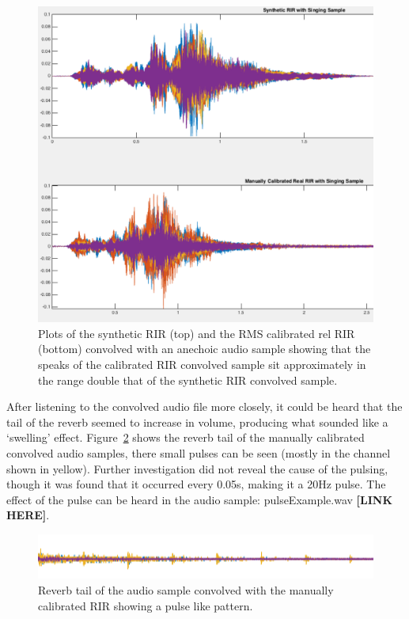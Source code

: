 \documentclass[../../main.tex]{subfiles}
\begin{document}
	\begin{figure}[H]
		\begin{center}
			\includegraphics[scale = 0.3]{Sections/Implementation/RealRIRs/images/calibration/CalMan_Sing_edit.png} 
			\caption{Plots of the synthetic \ac{RIR} (top) and the RMS calibrated rel \ac{RIR} (bottom) convolved with an anechoic audio sample showing that the speaks of the calibrated \ac{RIR} convolved sample sit approximately in the range double that of the synthetic \ac{RIR} convolved sample.}
			\label{calMansing}
		\end{center}
	\end{figure}

	After listening to the convolved audio file more closely, it could be heard that the tail of the reverb seemed to increase in volume, producing what sounded like a `swelling' effect. Figure~\ref{pulse} shows the reverb tail of the manually calibrated convolved audio samples, there small pulses can be seen (mostly in the channel shown in yellow). Further investigation did not reveal the cause of the pulsing, though it was found that it occurred every 0.05s, making it a 20Hz pulse. The effect of the pulse can be heard in the audio sample: pulseExample.wav \textbf{[LINK HERE]}.

	\begin{figure}[H]
		\begin{center}
			\includegraphics[scale = 1]{Sections/Implementation/RealRIRs/images/calibration/cal_pulse.png} 
			\caption{Reverb tail of the audio sample convolved with the manually calibrated \ac{RIR} showing a pulse like pattern.}
			\label{pulse}
		\end{center}
	\end{figure}
\end{document}
